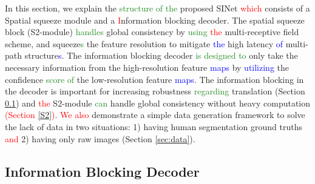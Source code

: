 \documentclass[10pt,twocolumn,letterpaper]{article}
\newcommand\Lars[1]{\textcolor{blue}{#1}}
\newcommand\yj[1]{\textcolor{ForestGreen}{#1}}
\newcommand\nj[1]{\textcolor{red}{#1}}
\newcommand\Lars[1]{#1}
\newcommand\yj[1]{#1}
\newcommand\nj[1]{#1}
\begin{document}
In this section, we explain the \yj{structure of the} proposed SINet \nj{which} consists of a Spatial squeeze module and a \nj{I}nformation blocking decoder. 
The spatial squeeze block (S2-module) \yj{handles} global consistency by \yj{using} \nj{the} multi-receptive field scheme, and squeeze\yj{s} the feature resolution to mitigate \Lars{the} high latency \Lars{of} multi-path structure\Lars{s}. 
The information blocking decoder \yj{is designed to} only take the necessary information from the high-resolution feature \Lars{maps} by \Lars{utilizing} the confidence \yj{score of} the low-resolution feature \Lars{maps}. 
The information blocking in the decoder is important for increasing robustness \yj{regarding} translation (Section \ref{IB_dnc}) and \nj{the} S2-module \yj{can} handle global consistency without heavy computation \nj{(Section \ref{S2})}. 
\nj{We also} demonstrate a simple data generation framework to solve the lack of data in two situations: 1) having human segmentation ground truths \nj{and} 2) having only raw images (Section \ref{sec:data}). 

\subsection{Information Blocking Decoder }
\label{IB_dnc}
\end{document}
